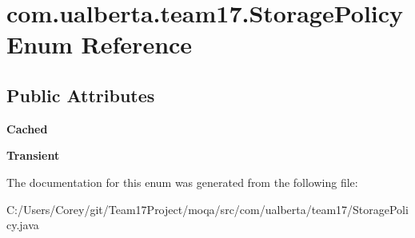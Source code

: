 \hypertarget{enumcom_1_1ualberta_1_1team17_1_1_storage_policy}{\section{com.\+ualberta.\+team17.\+Storage\+Policy Enum Reference}
\label{enumcom_1_1ualberta_1_1team17_1_1_storage_policy}
}
\subsection*{Public Attributes}
\begin{DoxyCompactItemize}
\item 
\hypertarget{enumcom_1_1ualberta_1_1team17_1_1_storage_policy_ae2d70afed1fc6e787d2c56a7ff8c9b33}{{\bfseries Cached}}\label{enumcom_1_1ualberta_1_1team17_1_1_storage_policy_ae2d70afed1fc6e787d2c56a7ff8c9b33}

\item 
\hypertarget{enumcom_1_1ualberta_1_1team17_1_1_storage_policy_ad0998474f41d868746cd821bc6e4a3dd}{{\bfseries Transient}}\label{enumcom_1_1ualberta_1_1team17_1_1_storage_policy_ad0998474f41d868746cd821bc6e4a3dd}

\end{DoxyCompactItemize}


The documentation for this enum was generated from the following file\+:\begin{DoxyCompactItemize}
\item 
C\+:/\+Users/\+Corey/git/\+Team17\+Project/moqa/src/com/ualberta/team17/Storage\+Policy.\+java\end{DoxyCompactItemize}
